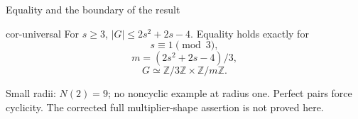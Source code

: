 \documentclass{beamer}
\begin{document}
\begin{frame}{Equality and the boundary of the result}
\begin{bookresult}{cor-universal}
For $s\ge3$, $|G|\le2s^2+2s-4$. Equality holds exactly for
\[s\equiv1\pmod3,\]
\[m=(2s^2+2s-4)/3,\]
\[G\simeq\mathbb Z/3\mathbb Z\times\mathbb Z/m\mathbb Z.\]
\end{bookresult}
Small radii: $N(2)=9$; no noncyclic example at radius one.
\medskip
Perfect pairs force cyclicity. The corrected full multiplier-shape assertion is not proved here.
\end{frame}
\appendix
\end{document}
